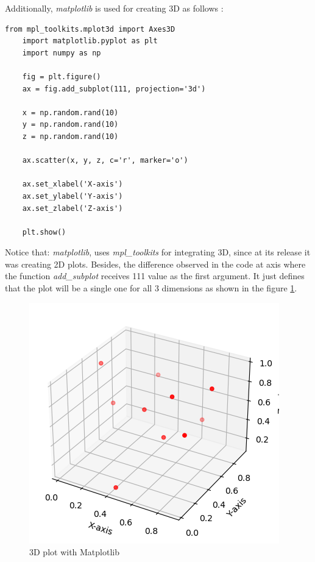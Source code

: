 \documentclass[12pt,a4paper]{report}
\begin{document}
Additionally, \textit{matplotlib} is used for creating 3D as follows : 
\begin{lstlisting}[style=stylepython]
	from mpl_toolkits.mplot3d import Axes3D
	import matplotlib.pyplot as plt
	import numpy as np
	
	fig = plt.figure()
	ax = fig.add_subplot(111, projection='3d')
	
	x = np.random.rand(10)
	y = np.random.rand(10)
	z = np.random.rand(10)
	
	ax.scatter(x, y, z, c='r', marker='o')
	
	ax.set_xlabel('X-axis')
	ax.set_ylabel('Y-axis')
	ax.set_zlabel('Z-axis')
	
	plt.show()
\end{lstlisting} 
Notice that: \textit{matplotlib}, uses \textit{mpl\_toolkits} for integrating 3D, since at its release it was creating 2D plots. 
Besides, the difference observed in the code at axis where the function \textit{add\_subplot} receives 111 value as the first argument. It just defines that the plot will be a single one for all 3 dimensions as shown in the figure \ref{fig:3ddimensionPlotlib}. 
\begin{figure}
	\centering
	\includegraphics[width=0.7\linewidth]{3Ddimension}
	\caption{3D plot with Matplotlib}
	\label{fig:3ddimensionPlotlib}
\end{figure}
\end{document}
